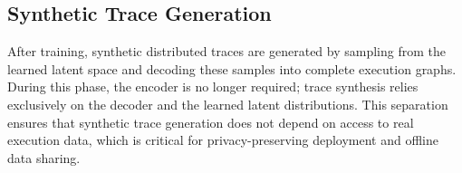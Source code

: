 \documentclass[sigconf,review]{acmart}
\begin{document}
\begin{table}
\centering
\color{blue}
\caption{\textcolor{blue}{Hyperparameter settings used in the reported VAE experiments.}}
\label{tab:hyperparams}
\end{table}

\subsection{Synthetic Trace Generation}
\label{sec:generation}

After training, synthetic distributed traces are generated by sampling from the learned latent space and decoding these samples into complete execution graphs. During this phase, the encoder is no longer required; trace synthesis relies exclusively on the decoder and the learned latent distributions. This separation ensures that synthetic trace generation does not depend on access to real execution data, which is critical for privacy-preserving deployment and offline data sharing.
\end{document}

